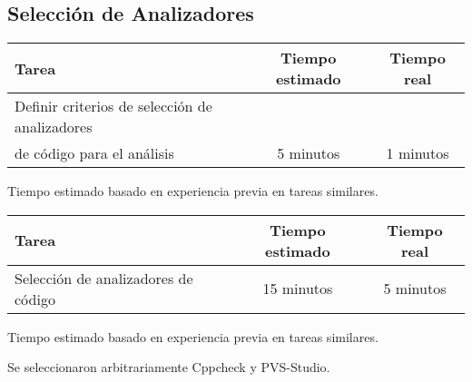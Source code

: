 \documentclass[12pt,a4paper]{article}
\begin{document}
\subsection{Selección de Analizadores}
    \begin{center}
        \begin{tabular}{|l|c|c|}
            \hline
            \textbf{Tarea} & \textbf{Tiempo estimado} & \textbf{Tiempo real} \\
            \hline
            Definir criterios de selección de analizadores\\ de código para el análisis & 5 minutos & 1 minutos \\
            \hline
        \end{tabular}
    \end{center}
    \begin{center}
        Tiempo estimado basado en experiencia previa en tareas similares.
    \end{center}
    \begin{center}
        \begin{tabular}{|l|c|c|}
            \hline
            \textbf{Tarea} & \textbf{Tiempo estimado} & \textbf{Tiempo real} \\
            \hline
            Selección de analizadores de código & 15 minutos & 5 minutos \\
            \hline
        \end{tabular}
    \end{center}
    \begin{center}
        Tiempo estimado basado en experiencia previa en tareas similares.
    \end{center}
Se seleccionaron arbitrariamente Cppcheck y PVS-Studio.
\end{document}
